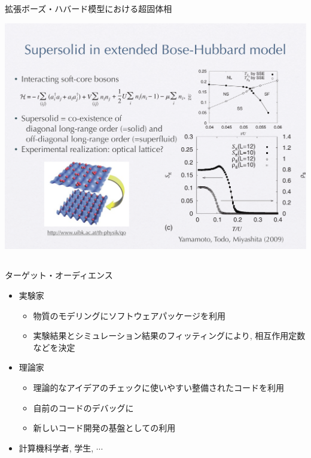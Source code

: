 \subsection*{\redb\whiteb\greenb}
\begin{frame}[fragile]{拡張ボーズ・ハバード模型における超固体相}
  \begin{center}
    \includegraphics[height=.8\textheight]{supersolid.pdf}
  \end{center}
\end{frame}

\subsection*{\redb\whiteb\greenb}
\begin{frame}[t,fragile]{ターゲット・オーディエンス}
  \begin{itemize}
    \setlength{\itemsep}{1em}
  \item 実験家
    \begin{itemize}
    \item 物質のモデリングにソフトウェアパッケージを利用
    \item 実験結果とシミュレーション結果のフィッティングにより, 相互作用定数などを決定
    \end{itemize}
  \item 理論家
    \begin{itemize}
    \item 理論的なアイデアのチェックに使いやすい整備されたコードを利用
    \item 自前のコードのデバッグに
    \item 新しいコード開発の基盤としての利用
    \end{itemize}
  \item 計算機科学者, 学生, $\cdots$
  \end{itemize}
\end{frame}

